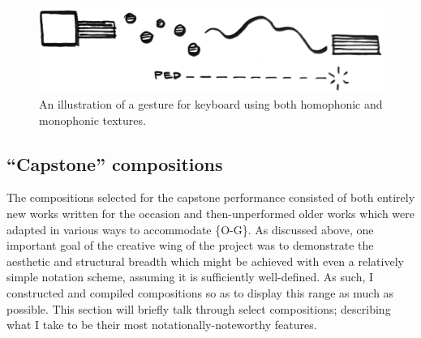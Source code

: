     \begin{figure}
        \centering
        \includegraphics[width=.8\textwidth]{images/chapter4/04-chords5.png}
        \captionsetup{width=.5\textwidth}
        \caption[An illustration of a gesture for keyboard using both homophonic and monophonic textures.]{An illustration of a gesture for keyboard using both homophonic and monophonic textures.\footnotemark}
        \label{fig:homophonic}
    \end{figure}


    
    \subsection{``Capstone'' compositions}
    
        

    The compositions selected for the capstone performance consisted of both entirely new works written for the occasion and then-unperformed older works which were adapted in various ways to accommodate \{O-G\}. As discussed above, one important goal of the creative wing of the project was to demonstrate the aesthetic and structural breadth which might be achieved with even a relatively simple notation scheme, assuming it is sufficiently well-defined. As such, I constructed and compiled compositions so as to display this range as much as possible. This section will briefly talk through select compositions; describing what I take to be their most notationally-noteworthy features.

